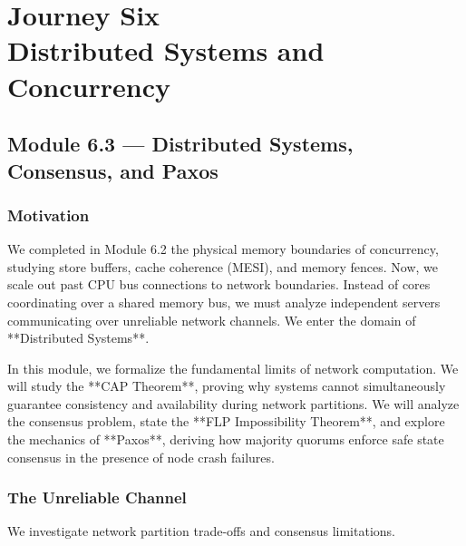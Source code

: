 \documentclass[12pt, a4paper]{book}
\begin{document}
\setcounter{chapter}{5}
\chapter[Journey 6 --- Distributed Systems and Concurrency]
        {Journey Six\\[8pt]
         \textcolor{ModuleColor}{\large Distributed Systems and Concurrency}}
\setcounter{section}{2}

\section{Module 6.3 --- Distributed Systems, Consensus, and Paxos}
\label{sec:mod6.3}

\subsection*{Motivation}

We completed in Module 6.2 the physical memory boundaries of concurrency, studying store buffers, cache coherence (MESI), and memory fences.
Now, we scale out past CPU bus connections to network boundaries.
Instead of cores coordinating over a shared memory bus, we must analyze independent servers communicating over unreliable network channels.
We enter the domain of **Distributed Systems**.

In this module, we formalize the fundamental limits of network computation.
We will study the **CAP Theorem**, proving why systems cannot simultaneously guarantee consistency and availability during network partitions.
We will analyze the consensus problem, state the **FLP Impossibility Theorem**, and explore the mechanics of **Paxos**, deriving how majority quorums enforce safe state consensus in the presence of node crash failures.

\subsection{The Unreliable Channel}

We investigate network partition trade-offs and consensus limitations.
\end{document}
